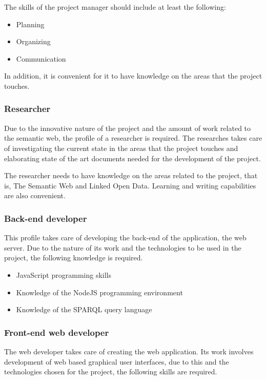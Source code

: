The skills of the project manager should include at least the following:

\begin{itemize}
\item Planning
\item Organizing
\item Communication
\end{itemize}

In addition, it is convenient for it to have knowledge on the areas that the project touches.

\subsubsection*{Researcher}

Due to the innovative nature of the project and the amount of work related to the semantic web, the profile of a researcher is required. The researches takes care of investigating the current state in the areas that the project touches and elaborating state of the art documents needed for the development of the project.

The researcher needs to have knowledge on the areas related to the project, that is, The Semantic Web and Linked Open Data. Learning and writing capabilities are also convenient.

\subsubsection*{Back-end developer}

This profile takes care of developing the back-end of the application, the web server. Due to the nature of its work and the technologies to be used in the project, the following knowledge is required.

\begin{itemize}
\item JavaScript programming skills
\item Knowledge of the NodeJS programming environment
\item Knowledge of the SPARQL query language
\end{itemize}

\subsubsection*{Front-end web developer}

The web developer takes care of creating the web application. Its work involves development of web based graphical user interfaces, due to this and the technologies chosen for the project, the following skills are required.

